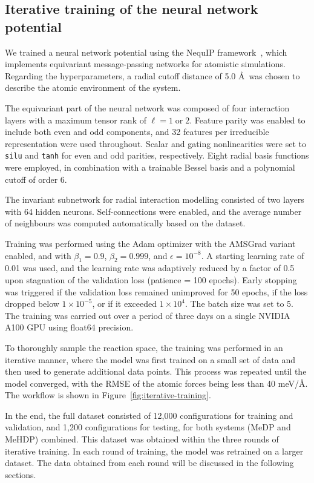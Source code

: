 \subsection{Iterative training of the neural network potential} \label{subsec:iterative-training-of-the-neural-network-potential}
We trained a neural network potential using the NequIP framework~\citep{batznerE3equivariantGraphNeural2022}, which implements equivariant message-passing networks for atomistic simulations. Regarding the hyperparameters, a radial cutoff distance of 5.0 \AA\ was chosen to describe the atomic environment of the system.

The equivariant part of the neural network was composed of four interaction layers with a maximum tensor rank of $\ell = 1 \; \text{or} \; 2$. Feature parity was enabled to include both even and odd components, and 32 features per irreducible representation were used throughout. Scalar and gating nonlinearities were set to \texttt{silu} and \texttt{tanh} for even and odd parities, respectively. Eight radial basis functions were employed, in combination with a trainable Bessel basis and a polynomial cutoff of order 6.

The invariant subnetwork for radial interaction modelling consisted of two layers with 64 hidden neurons. Self-connections were enabled, and the average number of neighbours was computed automatically based on the dataset.

Training was performed using the Adam optimizer with the AMSGrad variant enabled, and with $\beta_1 = 0.9$, $\beta_2 = 0.999$, and $\epsilon = 10^{-8}$. A starting learning rate of 0.01 was used, and the learning rate was adaptively reduced by a factor of 0.5 upon stagnation of the validation loss (patience = 100 epochs). Early stopping was triggered if the validation loss remained unimproved for 50 epochs, if the loss dropped below $1 \times 10^{-5}$, or if it exceeded $1 \times 10^{4}$. The batch size was set to 5. The training was carried out over a period of three days on a single NVIDIA A100 GPU using float64 precision.

To thoroughly sample the reaction space, the training was performed in an iterative manner, where the model was first trained on a small set of data and then used to generate additional data points. This process was repeated until the model converged, with the RMSE of the atomic forces being less than 40 meV/\AA. The workflow is shown in Figure~\ref{fig:iterative-training}.

In the end, the full dataset consisted of 12,000 configurations for training and validation, and 1,200 configurations for testing, for both systems (MeDP and MeHDP) combined. This dataset was obtained within the three rounds of iterative training. In each round of training, the model was retrained on a larger dataset. The data obtained from each round will be discussed in the following sections.

